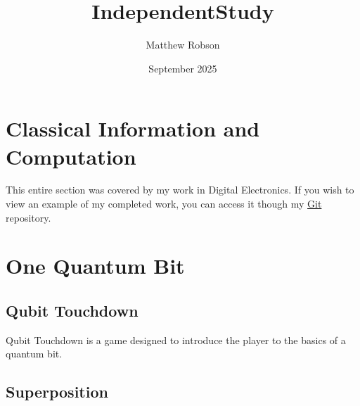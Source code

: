 \documentclass{article}
\title{IndependentStudy}
\author{Matthew Robson}
\date{September 2025}
\begin{document}
\maketitle

\section{Classical Information and Computation} %

This entire section was covered by my work in Digital Electronics. If you wish to view an example of my completed work, you can access it though my \href{https://github.com/orange314159}{Git} repository. 

\section{One Quantum Bit} %

\subsection{Qubit Touchdown} %

Qubit Touchdown is a game designed to introduce the player to the basics of a quantum bit.

\subsection{Superposition}
\end{document}
